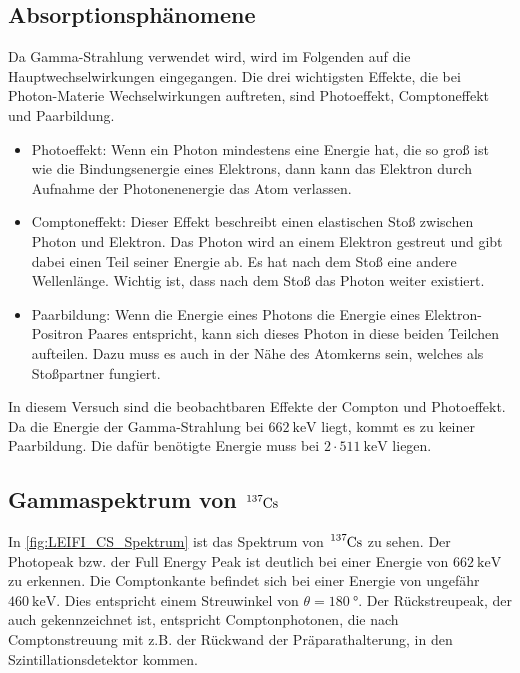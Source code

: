 \subsection{Absorptionsphänomene}
Da Gamma-Strahlung verwendet wird, wird im Folgenden auf die Hauptwechselwirkungen eingegangen.
Die drei wichtigsten Effekte, die bei Photon-Materie Wechselwirkungen auftreten, sind Photoeffekt, Comptoneffekt und Paarbildung.
\begin{itemize}
    \item   Photoeffekt: Wenn ein Photon mindestens eine Energie hat, die so groß ist wie die Bindungsenergie eines Elektrons, dann kann das Elektron durch Aufnahme der Photonenenergie das Atom verlassen.
    
    \item   Comptoneffekt: Dieser Effekt beschreibt einen elastischen Stoß zwischen Photon und Elektron.
            Das Photon wird an einem Elektron gestreut und gibt dabei einen Teil seiner Energie ab.
            Es hat nach dem Stoß eine andere Wellenlänge. Wichtig ist, dass nach dem Stoß das Photon weiter existiert.
    
    \item   Paarbildung: Wenn die Energie eines Photons die Energie eines Elektron-Positron Paares entspricht, kann sich dieses Photon in diese beiden Teilchen aufteilen.
            Dazu muss es auch in der Nähe des Atomkerns sein, welches als Stoßpartner fungiert. 
    
\end{itemize}

\noindent
In diesem Versuch sind die beobachtbaren Effekte der Compton und Photoeffekt.
Da die Energie der Gamma-Strahlung bei $\SI{662}{\kilo\electronvolt}$ \cite{LEIFI} liegt, kommt es zu keiner Paarbildung.
Die dafür benötigte Energie muss bei $2 \cdot \SI{511}{\kilo\electronvolt}$ liegen.

\subsection{Gammaspektrum von $\ce{^{137}Cs}$}
In \autoref{fig:LEIFI_CS_Spektrum} ist das Spektrum von $\ce{^{137}Cs}$ zu sehen.
Der Photopeak bzw. der Full Energy Peak ist deutlich bei einer Energie von $\SI{662}{\kilo\electronvolt}$ zu erkennen. 
Die Comptonkante befindet sich bei einer Energie von ungefähr $\SI{460}{\kilo\electronvolt}$. Dies 
entspricht einem Streuwinkel von $\theta = \SI{180}{\degree}$. Der Rückstreupeak, der auch gekennzeichnet ist, 
entspricht Comptonphotonen, die nach Comptonstreuung mit z.B. der Rückwand der Präparathalterung, in den Szintillationsdetektor kommen.  

